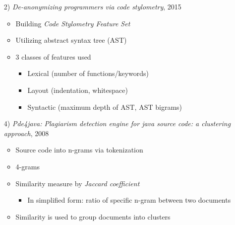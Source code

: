 \documentclass[t,12pt,pdftex]{beamer}
\begin{document}
\begin{frame}
	\vspace{0.5in}
	\begin{itemize}
		\item[2)] \textit{De-anonymizing
programmers via code stylometry}, 2015
		\begin{itemize}
			\item Building \textit{Code Stylometry Feature Set}
			\item Utilizing abstract syntax tree (AST)
			\item 3 classes of features used
			\begin{itemize}
				\item Lexical (number of functions/keywords)
				\item Layout (indentation, whitespace)
				\item Syntactic (maximum depth of AST, AST bigrams)
			\end{itemize}
		\end{itemize}
	\end{itemize}
\end{frame}

\begin{frame}
	\vspace{0.5in}
	\begin{itemize}
		\item[4)] \textit{Pde4java: Plagiarism detection
engine for java source code: a clustering approach}, 2008
		\begin{itemize}
			\item Source code into n-grams via tokenization
			\item 4-grams 
			\item Similarity measure by \textit{Jaccard coefficient}
			\begin{itemize}
				\item In simplified form: ratio of specific n-gram between two documents
			\end{itemize}
			\item Similarity is used to group documents into clusters
		\end{itemize}
	\end{itemize}
\end{frame}
\end{document}
